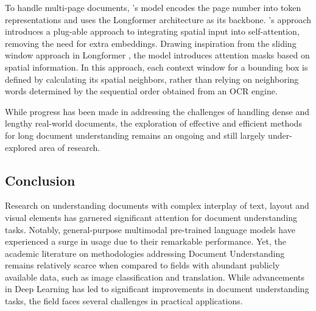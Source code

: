 To handle multi-page documents, \citet{pramanik2020towards}'s model encodes the page number into token representations and uses the Longformer architecture as its backbone. \citet{pham2022understanding}'s approach introduces a plug-able approach to integrating spatial input into self-attention, removing the need for extra embeddings. Drawing inspiration from the sliding window approach in Longformer \citep{beltagy2020longformer}, the model introduces attention masks based on spatial information. In this approach, each context window for a bounding box is defined by calculating its spatial neighbors, rather than relying on neighboring words determined by the sequential order obtained from an \ac{OCR} engine.

While progress has been made in addressing the challenges of handling dense and lengthy real-world documents, the exploration of effective and efficient methods for long document understanding remains an ongoing and still largely under-explored area of research. 


\subsection{Conclusion}

Research on understanding documents with complex interplay of text, layout and visual elements has garnered significant attention for document understanding tasks. Notably, general-purpose multimodal pre-trained language models have experienced a surge in usage due to their remarkable performance. Yet, the academic literature on methodologies addressing Document Understanding remains relatively scarce when compared to fields with abundant publicly available data, such as image classification and translation. While advancements in Deep Learning has led to significant improvements in document understanding tasks, the field faces several challenges in practical applications. 

